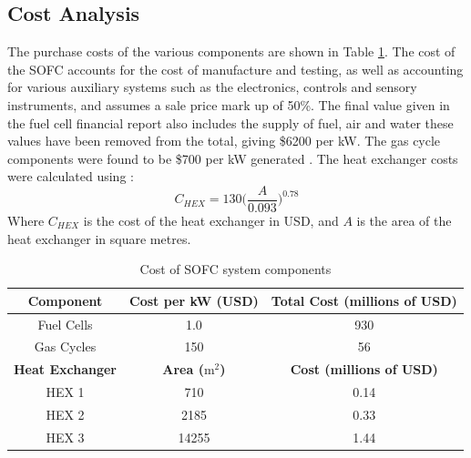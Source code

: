 \subsection{Cost Analysis} \label{ssec:heatexcost}

The purchase costs of the various components are shown in Table \ref{LMtable:SOFCcyclecosts}. The cost of the SOFC accounts for the cost of manufacture and testing, as well as accounting for various auxiliary systems such as the electronics, controls and sensory instruments, and assumes a sale price mark up of 50\%. The final value given in the fuel cell financial report \cite{LM21} also includes the supply of fuel, air and water \text{-} these values have been removed from the total, giving \$6200 per kW. The gas cycle components were found to be \$700 per kW generated \cite{LM22}. The heat exchanger costs were calculated using \cite{LM23}:
\begin{equation}
C_{HEX}=130\Big ( \frac{A}{0.093}\Big )	^{0.78} 					
\end{equation}
Where $C_{HEX}$ is the cost of the heat exchanger in USD, and $A$ is the area of the heat exchanger in square metres.


\begin{table}[h!]
\centering
\caption{Cost of SOFC system components}
\label{LMtable:SOFCcyclecosts}
\begin{tabular}{|c|c|c|}
\hline
\textbf{Component}      & \textbf{Cost per kW (USD)} & \textbf{Total Cost (millions of USD)} \\ \hline
Fuel Cells              & 1.0                        & 930                                   \\ \hline
Gas Cycles              & 150                        & 56                                    \\ \hline
\textbf{Heat Exchanger} & \textbf{Area ($\text{m}^{2}$)}         & \textbf{Cost (millions of USD)}       \\ \hline
HEX 1                   & 710                        & 0.14                                  \\ \hline
HEX 2                   & 2185                       & 0.33                                  \\ \hline
HEX 3                   & 14255                      & 1.44                                  \\ \hline
\end{tabular}
\end{table}

